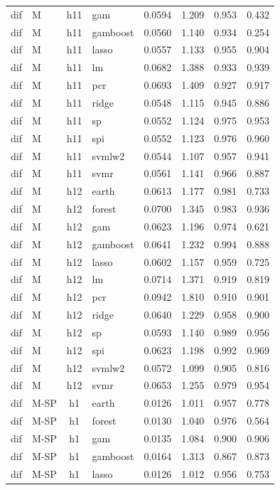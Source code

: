 \begin{ThreePartTable}
\begin{longtable}[t]{llclcccc}
dif & M & h11 & gam & 0.0594 & 1.209 & 0.953 & 0.432\\
dif & M & h11 & gamboost & 0.0560 & 1.140 & 0.934 & 0.254\\
dif & M & h11 & lasso & 0.0557 & 1.133 & 0.955 & 0.904\\
dif & M & h11 & lm & 0.0682 & 1.388 & 0.933 & 0.939\\
dif & M & h11 & pcr & 0.0693 & 1.409 & 0.927 & 0.917\\
dif & M & h11 & ridge & 0.0548 & 1.115 & 0.945 & 0.886\\
dif & M & h11 & sp & 0.0552 & 1.124 & 0.975 & 0.953\\
dif & M & h11 & spi & 0.0552 & 1.123 & 0.976 & 0.960\\
dif & M & h11 & svmlw2 & 0.0544 & 1.107 & 0.957 & 0.941\\
dif & M & h11 & svmr & 0.0561 & 1.141 & 0.966 & 0.887\\
\addlinespace
dif & M & h12 & earth & 0.0613 & 1.177 & 0.981 & 0.733\\
dif & M & h12 & forest & 0.0700 & 1.345 & 0.983 & 0.936\\
dif & M & h12 & gam & 0.0623 & 1.196 & 0.974 & 0.621\\
dif & M & h12 & gamboost & 0.0641 & 1.232 & 0.994 & 0.888\\
dif & M & h12 & lasso & 0.0602 & 1.157 & 0.959 & 0.725\\
dif & M & h12 & lm & 0.0714 & 1.371 & 0.919 & 0.819\\
dif & M & h12 & pcr & 0.0942 & 1.810 & 0.910 & 0.901\\
dif & M & h12 & ridge & 0.0640 & 1.229 & 0.958 & 0.900\\
dif & M & h12 & sp & 0.0593 & 1.140 & 0.989 & 0.956\\
dif & M & h12 & spi & 0.0623 & 1.198 & 0.992 & 0.969\\
dif & M & h12 & svmlw2 & 0.0572 & 1.099 & 0.905 & 0.816\\
dif & M & h12 & svmr & 0.0653 & 1.255 & 0.979 & 0.954\\
\addlinespace
dif & M-SP & h1 & earth & 0.0126 & 1.011 & 0.957 & 0.778\\
dif & M-SP & h1 & forest & 0.0130 & 1.040 & 0.976 & 0.564\\
dif & M-SP & h1 & gam & 0.0135 & 1.084 & 0.900 & 0.906\\
dif & M-SP & h1 & gamboost & 0.0164 & 1.313 & 0.867 & 0.873\\
dif & M-SP & h1 & lasso & 0.0126 & 1.012 & 0.956 & 0.753\\

\end{longtable}
\end{ThreePartTable}
